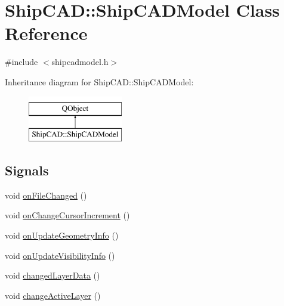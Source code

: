 \hypertarget{classShipCAD_1_1ShipCADModel}{\section{Ship\-C\-A\-D\-:\-:Ship\-C\-A\-D\-Model Class Reference}
\label{classShipCAD_1_1ShipCADModel}
}


{\ttfamily \#include $<$shipcadmodel.\-h$>$}

Inheritance diagram for Ship\-C\-A\-D\-:\-:Ship\-C\-A\-D\-Model\-:\begin{figure}[H]
\begin{center}
\leavevmode
\includegraphics[height=2.000000cm]{classShipCAD_1_1ShipCADModel}
\end{center}
\end{figure}
\subsection*{Signals}
\begin{DoxyCompactItemize}
\item 
void \hyperlink{classShipCAD_1_1ShipCADModel_ab1aed79b8aa1de37e47b73895d0109a2}{on\-File\-Changed} ()
\item 
void \hyperlink{classShipCAD_1_1ShipCADModel_a6220a9a190b01f64ff47fedc55bdf8f4}{on\-Change\-Cursor\-Increment} ()
\item 
void \hyperlink{classShipCAD_1_1ShipCADModel_a182524b67e4bd1fcfbf87a23dd9e2002}{on\-Update\-Geometry\-Info} ()
\item 
void \hyperlink{classShipCAD_1_1ShipCADModel_adaa7b692532a8e09fbb06d24979882f3}{on\-Update\-Visibility\-Info} ()
\item 
void \hyperlink{classShipCAD_1_1ShipCADModel_a7becf2a008e66bdac7f77c8c7026c713}{changed\-Layer\-Data} ()
\item 
void \hyperlink{classShipCAD_1_1ShipCADModel_a8aee085180cb37bf822fb856a270a3b3}{change\-Active\-Layer} ()
\end{DoxyCompactItemize}
